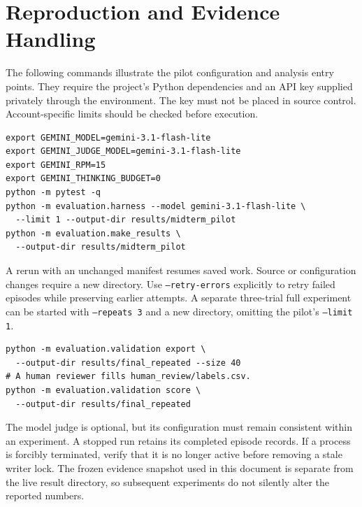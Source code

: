\documentclass[11pt,letterpaper]{article}
\begin{document}
\section{Reproduction and Evidence Handling}
The following commands illustrate the pilot configuration and analysis entry points. They require the project's Python dependencies and an API key supplied privately through the environment. The key must not be placed in source control. Account-specific limits should be checked before execution.
\begin{lstlisting}
export GEMINI_MODEL=gemini-3.1-flash-lite
export GEMINI_JUDGE_MODEL=gemini-3.1-flash-lite
export GEMINI_RPM=15
export GEMINI_THINKING_BUDGET=0
python -m pytest -q
python -m evaluation.harness --model gemini-3.1-flash-lite \
  --limit 1 --output-dir results/midterm_pilot
python -m evaluation.make_results \
  --output-dir results/midterm_pilot
\end{lstlisting}
A rerun with an unchanged manifest resumes saved work. Source or configuration changes require a new directory. Use \texttt{--retry-errors} explicitly to retry failed episodes while preserving earlier attempts. A separate three-trial full experiment can be started with \texttt{--repeats 3} and a new directory, omitting the pilot's \texttt{--limit 1}.
\begin{lstlisting}
python -m evaluation.validation export \
  --output-dir results/final_repeated --size 40
# A human reviewer fills human_review/labels.csv.
python -m evaluation.validation score \
  --output-dir results/final_repeated
\end{lstlisting}
The model judge is optional, but its configuration must remain consistent within an experiment. A stopped run retains its completed episode records. If a process is forcibly terminated, verify that it is no longer active before removing a stale writer lock. The frozen evidence snapshot used in this document is separate from the live result directory, so subsequent experiments do not silently alter the reported numbers.
\end{document}
